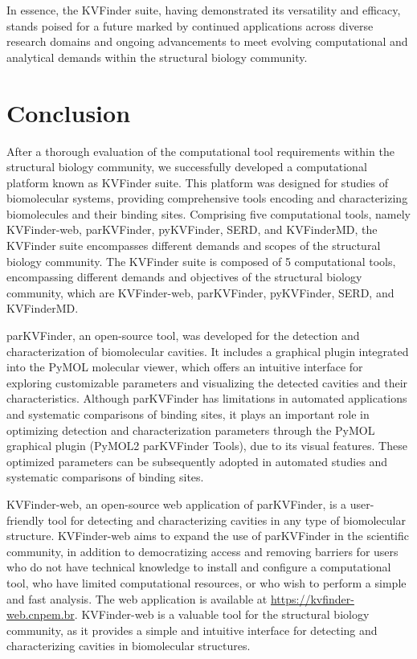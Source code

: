 \documentclass[Ingles]{phdthesis}
\begin{document}
In essence, the KVFinder suite, having demonstrated its versatility and efficacy, stands poised for a future marked by continued applications across diverse research domains and ongoing advancements to meet evolving computational and analytical demands within the structural biology community.


\chapter{Conclusion}

After a thorough evaluation of the computational tool requirements within the structural biology community, we successfully developed a computational platform known as KVFinder suite. This platform was designed for studies of biomolecular systems, providing comprehensive tools encoding and characterizing biomolecules and their binding sites. Comprising five computational tools, namely KVFinder-web, parKVFinder, pyKVFinder, SERD, and KVFinderMD, the KVFinder suite encompasses different demands and scopes of the structural biology community.
The KVFinder suite is composed of 5 computational tools, encompassing different demands and objectives of the structural biology community, which are KVFinder-web, parKVFinder, pyKVFinder, SERD, and KVFinderMD.

parKVFinder, an open-source tool, was developed for the detection and characterization of biomolecular cavities. It includes a graphical plugin integrated into the PyMOL molecular viewer, which offers an intuitive interface for exploring customizable parameters and visualizing the detected cavities and their characteristics. Although parKVFinder has limitations in automated applications and systematic comparisons of binding sites, it plays an important role in optimizing detection and characterization parameters through the PyMOL graphical plugin (PyMOL2 parKVFinder Tools), due to its visual features. These optimized parameters can be subsequently adopted in automated studies and systematic comparisons of binding sites.

KVFinder-web, an open-source web application of parKVFinder, is a user-friendly tool for detecting and characterizing cavities in any type of biomolecular structure. KVFinder-web aims to expand the use of parKVFinder in the scientific community, in addition to democratizing access and removing barriers for users who do not have technical knowledge to install and configure a computational tool, who have limited computational resources, or who wish to perform a simple and fast analysis. The web application is available at \url{https://kvfinder-web.cnpem.br}. KVFinder-web is a valuable tool for the structural biology community, as it provides a simple and intuitive interface for detecting and characterizing cavities in biomolecular structures.
\end{document}
